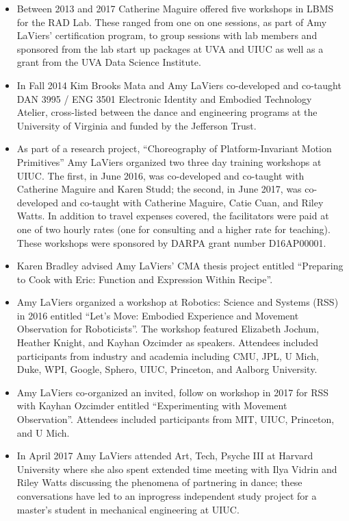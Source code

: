 \documentclass[arts,article,submit,moreauthors,pdftex,10pt,a4paper]{mdpi}
\begin{document}
\begin{itemize}
\item Between 2013 and 2017 Catherine Maguire offered five workshops in LBMS for the RAD Lab.  These ranged from one on one sessions, as part of Amy LaViers' certification program, to group sessions with lab members and sponsored from the lab start up packages at UVA and UIUC as well as a grant from the UVA Data Science Institute. 
\item In Fall 2014 Kim Brooks Mata and Amy LaViers co-developed and co-taught DAN 3995 / ENG 3501 Electronic Identity and Embodied Technology Atelier, cross-listed between the dance and engineering programs at the University of Virginia and funded by the Jefferson Trust.
\item As part of a research project, ``Choreography of Platform-Invariant Motion Primitives'' Amy LaViers organized two three day training workshops at UIUC.  The first, in June 2016, was co-developed and co-taught with Catherine Maguire and Karen Studd; the second, in June 2017, was co-developed and co-taught with Catherine Maguire, Catie Cuan, and Riley Watts.  In addition to travel expenses covered, the facilitators were paid at one of two hourly rates (one for consulting and a higher rate for teaching).  These workshops were sponsored by DARPA grant number D16AP00001.
\item Karen Bradley advised Amy LaViers' CMA thesis project entitled ``Preparing to Cook with Eric: Function and Expression Within Recipe''.
\item Amy LaViers organized a workshop at Robotics: Science and Systems (RSS) in 2016 entitled ``Let's Move: Embodied Experience and Movement Observation for Roboticists''.  The workshop featured Elizabeth Jochum, Heather Knight, and Kayhan Ozcimder as speakers.  Attendees included participants from industry and academia including CMU, JPL, U Mich, Duke, WPI, Google, Sphero, UIUC, Princeton, and Aalborg University. 
\item Amy LaViers co-organized an invited, follow on workshop in 2017 for RSS with Kayhan Ozcimder entitled ``Experimenting with Movement Observation''.  Attendees included participants from MIT, UIUC, Princeton, and U Mich.
\item In April 2017 Amy LaViers attended Art, Tech, Psyche III at Harvard University where she also spent extended time meeting with Ilya Vidrin and Riley Watts discussing the phenomena of partnering in dance; these conversations have led to an inprogress independent study project for a master's student in mechanical engineering at UIUC.

\end{itemize}
\end{document}
